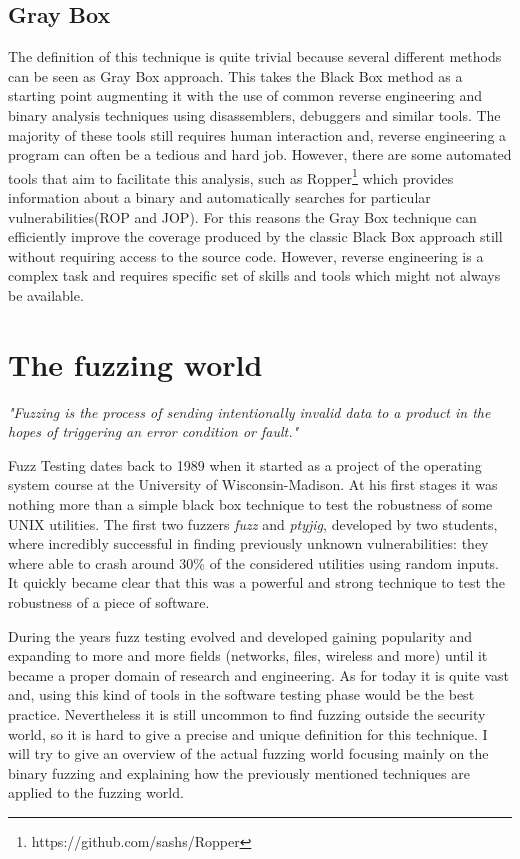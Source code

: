 \documentclass[../main.tex]{subfiles}
\begin{document}
\subsection{Gray Box}

The definition of this technique is quite trivial because several different
methods can be seen as Gray Box approach. This takes the Black Box method as a
starting point augmenting it with the use of common reverse engineering and
binary analysis techniques using disassemblers, debuggers and similar tools. The
majority of these tools still requires human interaction and, reverse
engineering a program can often be a tedious and hard job. However, there are
some automated tools that aim to facilitate this analysis, such as Ropper\footnote{https://github.com/sashs/Ropper} which provides
information about a binary and automatically searches for particular
vulnerabilities(ROP and JOP). For this reasons the Gray Box technique can
efficiently improve the coverage produced by the classic Black Box approach
still without requiring access to the source code. However, reverse
engineering is a complex task and requires specific set of skills and tools
which might not always be available.

\section{The fuzzing world}

\textit{"Fuzzing is the process of sending intentionally invalid data to a
product in the hopes of triggering an error condition or fault."}
\cite{Sutton2007}

Fuzz Testing dates back to 1989 when it started as a project of the operating
system course at the University of Wisconsin-Madison. At his first stages it
was nothing more than a simple black box technique to test the robustness of
some UNIX utilities. The first two fuzzers \textit{fuzz} and \textit{ptyjig},
developed by two students, where incredibly successful in finding previously
unknown vulnerabilities: they where able to crash around 30\% of the considered
utilities using random inputs\cite{firstFuzzPaper}.
It quickly became clear that this was a powerful and strong technique to test
the robustness of a piece of software.

During the years fuzz testing evolved and developed gaining popularity and
expanding to more and more fields (networks, files, wireless and more) until it
became a proper domain of research and engineering. As for today it is
quite vast and, using this kind of tools in the software testing phase would be the best practice. Nevertheless it is still uncommon to find fuzzing
outside the security world, so it is hard to give a precise and unique
definition for this technique. I will try to give an overview of the actual fuzzing world focusing mainly on the binary fuzzing and explaining how the previously mentioned techniques are applied to the fuzzing world.
\end{document}
